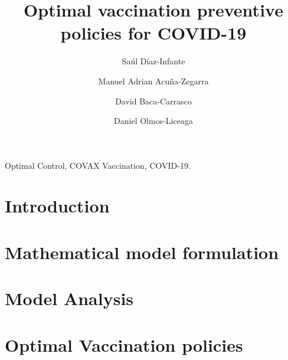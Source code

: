 \documentclass[3p, sort&compress]{elsarticle}
\begin{document}
    \begin{frontmatter}
        \title{
            Optimal vaccination preventive policies for COVID-19\\
        }
        \author[add:conacyt_unison]{%
            Sa\'ul D\'iaz-Infante%
        }%
        \address[add:conacyt_unison]{
            CONACYT-Universidad de Sonora,
            Departamento de Matem\'aticas,
            Blvd. Luis Encinas y Rosales S/N,
            Hermosillo, Sonora, M\'exico, C.P. 83000.
        }
        \author[add:unison]%
        {Manuel Adrian Acu\~na-Zegarra}
        \address[add:unison]{
            Departamento de Matem\'aticas, Universidad de Sonora,
            Blvd. Luis Encinas y Rosales S/N,
            Hermosillo, Sonora, M\'exico, C.P. 83000.
        }
        \author[add:itson]%
            {David Baca-Carrasco}
        \address[add:itson]{
                Departamento de Matem\'aticas, Instituto Tecnol\'ogico de
                Sonora, 5 de Febrero 818 Sur, Colonia Centro, Ciudad
                Obregón,
                Sonora, M\'exico, C.P. 85000.
        }
        \author[add:unison]%
        {Daniel Olmos-Liceaga}
    \begin{keyword}
        Optimal Control, COVAX
        Vaccination, COVID-19.
    \end{keyword}
    
\end{frontmatter}
%
    \section{Introduction}
        
    \section{Mathematical model formulation}
        
    \section{Model Analysis}
        
    \section{Optimal Vaccination policies}
        
\end{document}
